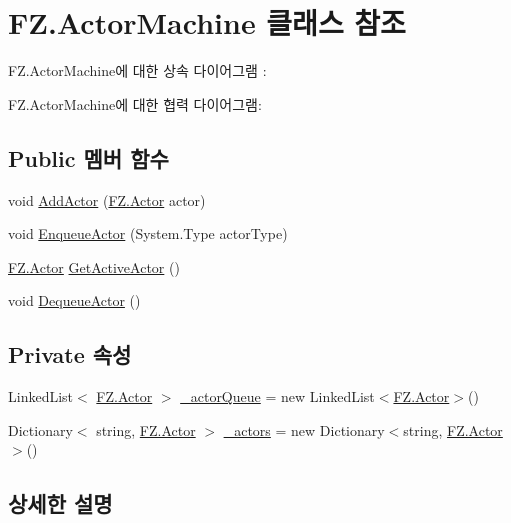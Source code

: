 \hypertarget{class_f_z_1_1_actor_machine}{}\section{F\+Z.\+Actor\+Machine 클래스 참조}
\label{class_f_z_1_1_actor_machine}


F\+Z.\+Actor\+Machine에 대한 상속 다이어그램 \+: 


F\+Z.\+Actor\+Machine에 대한 협력 다이어그램\+:
\subsection*{Public 멤버 함수}
\begin{DoxyCompactItemize}
\item 
void \hyperlink{class_f_z_1_1_actor_machine_abf6949bf5213c6b7eb9f7b2d0c677a23}{Add\+Actor} (\hyperlink{class_f_z_1_1_actor}{F\+Z.\+Actor} actor)
\item 
void \hyperlink{class_f_z_1_1_actor_machine_ac399a880001dbecdc39c1807f81e4eac}{Enqueue\+Actor} (System.\+Type actor\+Type)
\item 
\hyperlink{class_f_z_1_1_actor}{F\+Z.\+Actor} \hyperlink{class_f_z_1_1_actor_machine_a9f1efcf25b000d4634abcc97d361c629}{Get\+Active\+Actor} ()
\item 
void \hyperlink{class_f_z_1_1_actor_machine_a469fc3e9b02b02a2a8efb3e4c1e4101d}{Dequeue\+Actor} ()
\end{DoxyCompactItemize}
\subsection*{Private 속성}
\begin{DoxyCompactItemize}
\item 
Linked\+List$<$ \hyperlink{class_f_z_1_1_actor}{F\+Z.\+Actor} $>$ \hyperlink{class_f_z_1_1_actor_machine_a826fc2f6d597a9bca608d75bae961c0b}{\+\_\+actor\+Queue} = new Linked\+List$<$\hyperlink{class_f_z_1_1_actor}{F\+Z.\+Actor}$>$()
\item 
Dictionary$<$ string, \hyperlink{class_f_z_1_1_actor}{F\+Z.\+Actor} $>$ \hyperlink{class_f_z_1_1_actor_machine_a4c843d618b443f77c4ff40286f03f6b5}{\+\_\+actors} = new Dictionary$<$string, \hyperlink{class_f_z_1_1_actor}{F\+Z.\+Actor}$>$()
\end{DoxyCompactItemize}


\subsection{상세한 설명}


